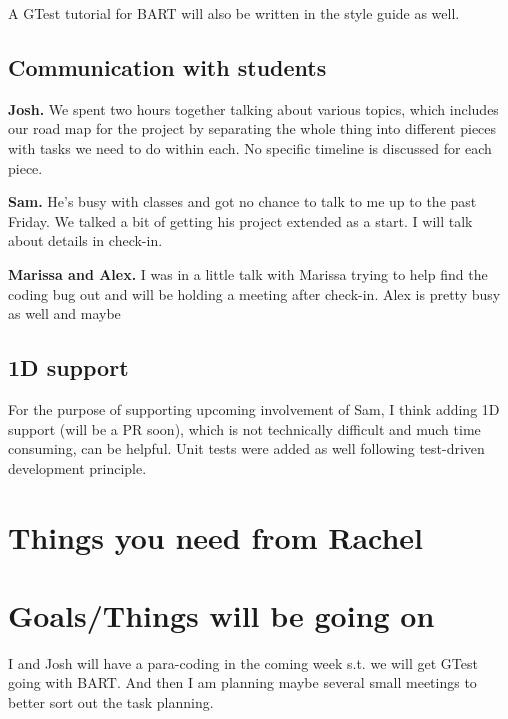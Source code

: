 \documentclass{article}
\begin{document}
A GTest tutorial for BART will also be written in the style guide as well.

\subsection{Communication with students}
{\bf Josh.} We spent two hours together talking about various topics, which includes our road map for the project by separating the whole thing into different pieces with tasks we need to do within each. No specific timeline is discussed for each piece.

{\bf Sam.} He's busy with classes and got no chance to talk to me up to the past Friday. We talked a bit of getting his project extended as a start. I will talk about details in check-in.

{\bf Marissa and Alex.} I was in a little talk with Marissa trying to help find the coding bug out and will be holding a meeting after check-in. Alex is pretty busy as well and maybe 

\subsection{1D support}
For the purpose of supporting upcoming involvement of Sam, I think adding 1D support (will be a PR soon), which is not technically difficult and much time consuming, can be helpful. Unit tests were added as well following test-driven development principle.
\section{Things you need from Rachel}


\section{Goals/Things will be going on}
I and Josh will have a para-coding in the coming week s.t. we will get GTest going with BART. And then I am planning maybe several small meetings to better sort out the task planning.

\end{document}
